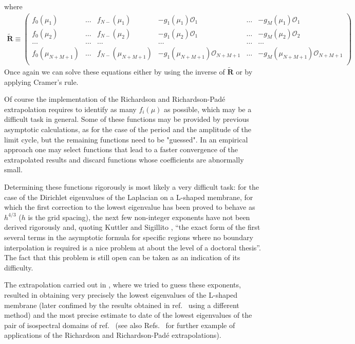 \documentclass[final]{article}
\begin{document}
where
\begin{equation}
\begin{split}
\tilde{\mathbf{R}} \equiv \left(
\begin{array}{cccccc}
f_0(\mu_1) & \dots & f_{N-}(\mu_1) & - g_1(\mu_1) \mathcal{O}_1 & \dots & - g_M(\mu_1) \mathcal{O}_1  \\
f_0(\mu_2) & \dots & f_{N-}(\mu_2) & - g_1(\mu_2) \mathcal{O}_1 & \dots & - g_M(\mu_2) \mathcal{O}_2  \\
\dots &  \dots &  \dots &  \dots & \dots & \dots \\         
f_0(\mu_{N+M+1}) & \dots & f_{N-}(\mu_{N+M+1}) & - g_1(\mu_{N+M+1}) \mathcal{O}_{N+M+1} & \dots & - g_M(\mu_{N+M+1}) \mathcal{O}_{N+M+1}  \\
\end{array}
\right)
\end{split}
\end{equation}
Once again we can solve these equations either by using the inverse of $\tilde{\mathbf{R}}$ or by applying Cramer's rule.

Of course the implementation of the Richardson and Richardson-Pad\'e extrapolation requires to identify as many $f_i(\mu)$ as possible, which may be  a difficult task in general. Some of these
functions may be provided by previous asymptotic calculations, as for the case of the period and the amplitude of the limit cycle, but the remaining functions need to be "guessed". 
In an empirical approach one may select functions that lead to a faster convergence of the extrapolated results and discard functions whose coefficients are abnormally small.

Determining  these functions rigorously is most likely a very difficult task: for the case of the Dirichlet eigenvalues of the Laplacian on a L-shaped membrane, for which the first correction 
to the lowest eigenvalue has been proved to behave as $h^{4/3}$ ($h$ is the grid spacing),  the next few non-integer exponents have not been derived rigorously and, quoting 
Kuttler and Sigillito \cite{Kuttler84}, “the exact form of the ﬁrst several terms in the asymptotic formula for
 speciﬁc regions where no boundary interpolation is required is a nice problem at about the level of a doctoral thesis”. The fact that this problem is still open can be taken as an indication of its difficulty.

The extrapolation carried out in \cite{Amore16}, where we tried to guess these exponents, resulted in obtaining very precisely the lowest eigenvalues of the L-shaped
membrane (later confimed by the results obtained in ref.~\cite{Jones17} using a different method) and the most precise estimate to date of the lowest eigenvalues of the pair of isospectral domains
of ref.~\cite{Gordon92} (see also Refs.~\cite{Amore19,Amore19b} for further example of applications of the Richardson and Richardson-Pad\'e extrapolations).
\end{document}
